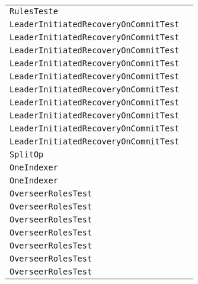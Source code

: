 \begin{center}
\begin{tabular}{ll}
\lstinline/RulesTeste/&\raisebox{0pt}{\lstinline/ModifyColl()/}\\
\lstinline/LeaderInitiatedRecoveryOnCommitTest/&\raisebox{0pt}{\lstinline/oneShardTest()/}\\
\lstinline/LeaderInitiatedRecoveryOnCommitTest/&\raisebox{0pt}{\lstinline/oneShardTest()/}\\
\lstinline/LeaderInitiatedRecoveryOnCommitTest/&\raisebox{0pt}{\lstinline/oneShardTest()/}\\
\lstinline/LeaderInitiatedRecoveryOnCommitTest/&\raisebox{0pt}{\lstinline/oneShardTest()/}\\
\lstinline/LeaderInitiatedRecoveryOnCommitTest/&\raisebox{0pt}{\lstinline/oneShardTest()/}\\
\lstinline/LeaderInitiatedRecoveryOnCommitTest/&\raisebox{0pt}{\lstinline/oneShardTest()/}\\
\lstinline/LeaderInitiatedRecoveryOnCommitTest/&\raisebox{0pt}{\lstinline/oneShardTest()/}\\
\lstinline/LeaderInitiatedRecoveryOnCommitTest/&\raisebox{0pt}{\lstinline/oneShardTest()/}\\
\lstinline/LeaderInitiatedRecoveryOnCommitTest/&\raisebox{0pt}{\lstinline/oneShardTest()/}\\
\lstinline/LeaderInitiatedRecoveryOnCommitTest/&\raisebox{0pt}{\lstinline/oneShardTest()/}\\
\lstinline/SplitOp/&\raisebox{0pt}{\lstinline/execute(CoreAdminHandler.CallInfoit)/}\\
\lstinline/OneIndexer/&\raisebox{0pt}{\lstinline/run()/}\\
\lstinline/OneIndexer/&\raisebox{0pt}{\lstinline/run()/}\\
\lstinline/OverseerRolesTest/&\raisebox{0pt}{\lstinline/setOverseerRole(CloudSolr)/}\\
\lstinline/OverseerRolesTest/&\raisebox{0pt}{\lstinline/setOverseerRole(CloudSolr)/}\\
\lstinline/OverseerRolesTest/&\raisebox{0pt}{\lstinline/setOverseerRole(CloudSolr)/}\\
\lstinline/OverseerRolesTest/&\raisebox{0pt}{\lstinline/setOverseerRole(CloudSolr)/}\\
\lstinline/OverseerRolesTest/&\raisebox{0pt}{\lstinline/setOverseerRole(CloudSolr)/}\\
\lstinline/OverseerRolesTest/&\raisebox{0pt}{\lstinline/setOverseerRole(CloudSolr)/}\\
\lstinline/OverseerRolesTest/&\raisebox{0pt}{\lstinline/setOverseerRole(CloudSolr)/}\\

\end{tabular}
\end{center}
